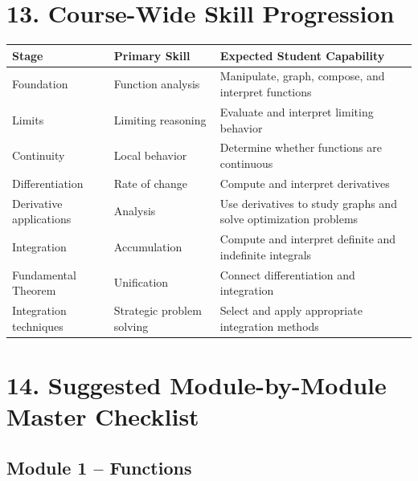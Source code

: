\documentclass[11pt]{article}
\begin{document}
\section{13. Course-Wide Skill Progression}

\begin{longtable}{p{} p{} p{}}
\toprule
\textbf{Stage} & \textbf{Primary Skill} & \textbf{Expected Student Capability} \\
\midrule
Foundation &
Function analysis &
Manipulate, graph, compose, and interpret functions \\

Limits &
Limiting reasoning &
Evaluate and interpret limiting behavior \\

Continuity &
Local behavior &
Determine whether functions are continuous \\

Differentiation &
Rate of change &
Compute and interpret derivatives \\

Derivative applications &
Analysis &
Use derivatives to study graphs and solve optimization problems \\

Integration &
Accumulation &
Compute and interpret definite and indefinite integrals \\

Fundamental Theorem &
Unification &
Connect differentiation and integration \\

Integration techniques &
Strategic problem solving &
Select and apply appropriate integration methods \\
\bottomrule
\end{longtable}

\section{14. Suggested Module-by-Module Master Checklist}

\subsection*{Module 1 -- Functions}
\end{document}
